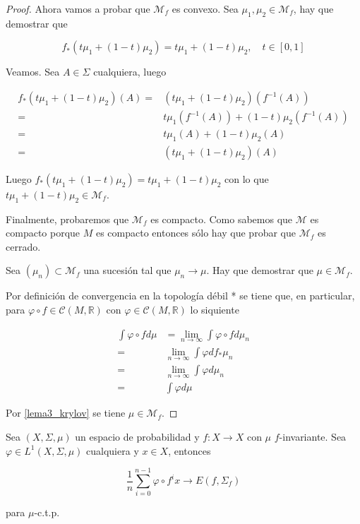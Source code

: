 \begin{proof}
	Ahora vamos a probar que $\mathcal{M}_f$ es convexo. Sea $\mu_1,\mu_2 \in \mathcal{M}_f$, hay que demostrar que
	
	\begin{equation}
	f_*(t\mu_1 + (1-t)\mu_2) = t\mu_1 + (1-t)\mu_2, \quad t \in [0,1]
	\end{equation}
	
	Veamos. Sea $A \in \Sigma$ cualquiera, luego 
	
	\begin{align}
	f_*(t\mu_1 + (1-t)\mu_2)(A) =& (t\mu_1 + (1-t)\mu_2)(f^{-1}(A))\\
	=& t\mu_1(f^{-1}(A)) + (1-t)\mu_2(f^{-1}(A))\\
	=& t\mu_1(A) + (1-t)\mu_2(A)\\
	=& (t\mu_1 + (1-t)\mu_2)(A)
	\end{align}
	
	Luego $f_*(t\mu_1 + (1-t)\mu_2) = t\mu_1 + (1-t)\mu_2$ con lo que $t\mu_1 + (1-t)\mu_2 \in \mathcal{M}_f$.
	
	Finalmente, probaremos que $\mathcal{M}_f$ es compacto. Como sabemos que $\mathcal{M}$ es compacto porque $M$ es compacto entonces sólo hay que probar que $\mathcal{M}_f$ es cerrado.
	
	Sea $(\mu_n) \subset \mathcal{M}_f$ una sucesión tal que $\mu_n \rightarrow \mu$. Hay que demostrar que $\mu \in \mathcal{M}_f$.
	
	Por definición de convergencia en la topología débil * se tiene que, en particular, para $\varphi \circ f \in \mathcal{C}(M,\mathbb{R})$ con $\varphi \in \mathcal{C}(M,\mathbb{R})$ lo siquiente
	
	\begin{align}
	\int \varphi \circ f d\mu &= \lim_{n \rightarrow \infty} \int \varphi \circ f d\mu_n\\
	=& \lim_{n \rightarrow \infty} \int \varphi df_*\mu_n\\
	=& \lim_{n \rightarrow \infty} \int \varphi d\mu_n\\
	=& \int \varphi d\mu
	\end{align}
	
	Por \ref{lema3_krylov} se tiene $\mu \in \mathcal{M}_f$.
\end{proof}

\begin{lema}\label{birkhoff-lema}
	Sea $(X,\Sigma,\mu)$ un espacio de probabilidad y $f: X \rightarrow X$ con $\mu$ $f$-invariante. Sea $\varphi \in L^1(X,\Sigma,\mu)$ cualquiera y $x \in X$, entonces
	
	\begin{equation}
		\frac{1}{n} \sum_{i=0}^{n-1} \varphi \circ f^i x \rightarrow E(f,\Sigma_f)
	\end{equation}
	
	para $\mu$-c.t.p.
	
\end{lema}

